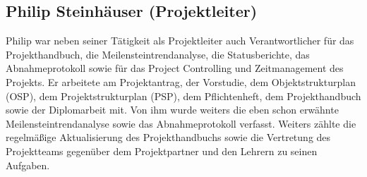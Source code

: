\newpage

\subsection{Philip Steinhäuser (Projektleiter)}
Philip war neben seiner Tätigkeit als Projektleiter auch Verantwortlicher für das Projekthandbuch, die Meilensteintrendanalyse, die Statusberichte, das Abnahmeprotokoll sowie für das Project Controlling und Zeitmanagement des Projekts.  Er arbeitete am Projektantrag, der Vorstudie, dem Objektstrukturplan (OSP), dem Projektstrukturplan (PSP), dem Pflichtenheft, dem Projekthandbuch sowie der Diplomarbeit mit. Von ihm wurde weiters die eben schon erwähnte Meilensteintrendanalyse sowie das Abnahmeprotokoll verfasst. Weiters zählte die regelmäßige Aktualisierung des Projekthandbuchs sowie die Vertretung des Projektteams gegenüber dem Projektpartner und den Lehrern zu seinen Aufgaben. 
